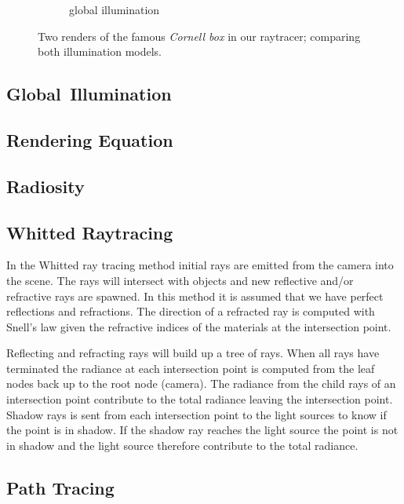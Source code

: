 \documentclass[a4paper, twocolumn]{article}
\begin{document}
\begin{figure}[ht]
\begin{subfigure}{0.48\linewidth}
            \caption{global illumination}
        \end{subfigure}
        \caption{Two renders of the famous \emph{Cornell box} in our raytracer; comparing both illumination models.}
    \end{figure}

    \subsection{Global\, Illumination} \label{sec:global_illumination}

    \subsection{Rendering Equation} \label{sec:rendering_equation}

    \newpage

    \subsection{Radiosity} \label{sec:radiosity}

    \subsection{Whitted Raytracing} \label{sec:whitted_raytracing}

    In the Whitted ray tracing method initial rays are emitted from the camera into the scene. The rays will intersect with objects and new reflective and/or refractive rays are spawned. In this method it is assumed that we have perfect reflections and refractions. The direction of a refracted ray is computed with Snell's law given the refractive indices of the materials at the intersection point.

    Reflecting and refracting rays will build up a tree of rays. When all rays have terminated the radiance at each intersection point is computed from the leaf nodes back up to the root node (camera). The radiance from the child rays of an intersection point contribute to the total radiance leaving the intersection point. Shadow rays is sent from each intersection point to the light sources to know if the point is in shadow. If the shadow ray reaches the light source the point is not in shadow and the light source therefore contribute to the total radiance. 

    \subsection{Path Tracing} \label{sec:path_tracing}
\end{document}
